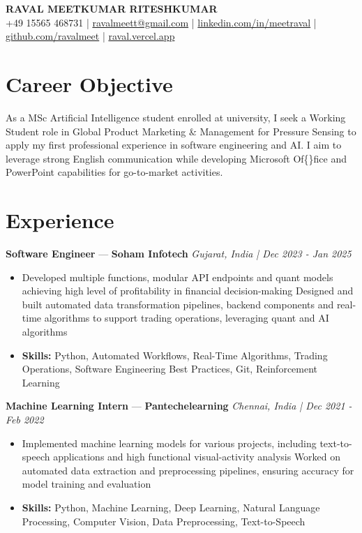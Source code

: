 \documentclass[a4paper,10pt]{article}
\begin{document}
\begin{center}
  {\Large\bfseries RAVAL MEETKUMAR RITESHKUMAR}\\[2pt]
  {\small +49 15565 468731 \;|\; \href{mailto:ravalmeett@gmail.com}{ravalmeett@gmail.com} \;|\; \href{https://www.linkedin.com/in/meetraval/}{linkedin.com/in/meetraval} \;|\; \href{https://github.com/ravalmeet}{github.com/ravalmeet} \;|\; \href{https://raval.vercel.app/}{raval.vercel.app}}
\end{center}
\vspace{-3pt}

\section*{Career Objective}
As a MSc Artificial Intelligence student enrolled at university, I seek a Working Student role in Global Product Marketing \& Management for Pressure Sensing to apply my first professional experience in software engineering and AI. I aim to leverage strong English communication while developing Microsoft Of\{\}fice and PowerPoint capabilities for go-to-market activities.\par

\section*{Experience}
\textbf{Software Engineer} — \textbf{Soham Infotech} \hfill \textit{Gujarat, India \;|\; Dec 2023 - Jan 2025}\par
\vspace{1pt}
\begin{itemize}
  \item Developed multiple functions, modular API endpoints and quant models achieving high level of profitability in financial decision-making Designed and built automated data transformation pipelines, backend components and real-time algorithms to support trading operations, leveraging quant and AI algorithms
  \item \textbf{Skills:} Python, Automated Workflows, Real-Time Algorithms, Trading Operations, Software Engineering Best Practices, Git, Reinforcement Learning
\end{itemize}
\vspace{3pt}
\textbf{Machine Learning Intern} — \textbf{Pantechelearning} \hfill \textit{Chennai, India \;|\; Dec 2021 - Feb 2022}\par
\vspace{1pt}
\begin{itemize}
  \item Implemented machine learning models for various projects, including text-to-speech applications and high functional visual-activity analysis Worked on automated data extraction and preprocessing pipelines, ensuring accuracy for model training and evaluation
  \item \textbf{Skills:} Python, Machine Learning, Deep Learning, Natural Language Processing, Computer Vision, Data Preprocessing, Text-to-Speech
\end{itemize}
\end{document}

